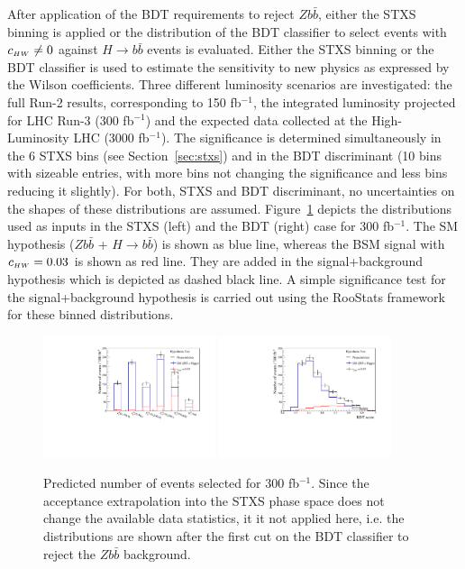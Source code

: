 After application of the BDT requirements to reject $Z b\bar{b}$, either the STXS binning is applied or the distribution of the BDT classifier to select events with $c_{\scriptscriptstyle HW} \neq 0$ against $H\to b\bar{b}$ events is evaluated. Either the STXS binning or the BDT classifier is used to estimate the sensitivity to new physics as expressed by the Wilson coefficients. Three different luminosity scenarios are investigated: the full Run-2 results, corresponding to 150 fb$^{-1}$, the integrated luminosity projected for LHC Run-3 (300 fb$^{-1}$) and the expected data collected at the High-Luminosity LHC (3000 fb$^{-1}$). The significance is determined simultaneously in the 6 STXS bins (see Section~\ref{sec:stxs}) and in the BDT discriminant (10 bins with sizeable entries, with more bins not changing the significance and less bins reducing it slightly). For both, STXS and BDT discriminant, no uncertainties on the shapes of these distributions are assumed. Figure~\ref{fig:hypotest} depicts the distributions used as inputs in the STXS (left) and the BDT (right) case for 300 fb$^{-1}$. The SM hypothesis ($Z b\bar{b}$ + $H\to b\bar{b}$) is shown as blue line, whereas the BSM signal with $c_{\scriptscriptstyle HW} = 0.03$ is shown as red line. They are added in the signal+background hypothesis which is depicted as dashed black line. A simple significance test for the signal+background hypothesis is carried out using the {\sc RooStats} framework~\cite{Moneta:2010pm} for these binned distributions. 
 
 
\begin{figure}[htb]
\centering
      \includegraphics[width=0.45\textwidth]{plots/HypoTest_STXS.pdf}
      \includegraphics[width=0.45\textwidth]{plots/HypoTest_BDT.pdf}
      \caption{Predicted number of events selected for 300 fb$^{-1}$. Since the acceptance extrapolation into the STXS phase space does not change the available data statistics, it it not applied here, i.e. the distributions are shown after the first cut on the BDT classifier to reject the $Z b\bar{b}$ background.}
\label{fig:hypotest}
\end{figure}

